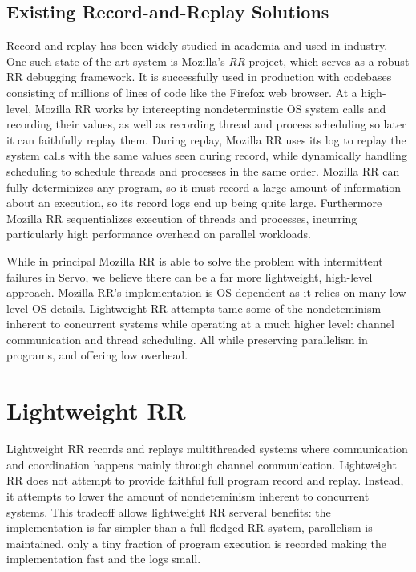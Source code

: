\documentclass{article}
\begin{document}
\subsection{Existing Record-and-Replay Solutions}
Record-and-replay has been widely studied in academia and used in industry. One
such state-of-the-art system is Mozilla's \textit{RR} project, which serves
as a robust RR debugging framework. It is successfully used in production
with codebases consisting of millions of lines of code like the Firefox web browser.
At a high-level, Mozilla RR works by intercepting nondeterminstic OS system calls and recording
their values, as well as recording thread and process scheduling so later it can faithfully
replay them. During replay, Mozilla RR uses its log to replay the system calls with the same
values seen during record, while dynamically handling scheduling to schedule threads
and processes in the same order. Mozilla RR can fully determinizes any program,
so it must record a large amount of information about an execution, so its record logs
end up being quite large. Furthermore Mozilla RR sequentializes execution of threads and
processes, incurring particularly high performance overhead on parallel workloads.

While in principal Mozilla RR is able to solve the problem with intermittent failures in Servo,
we believe there can be a far more lightweight, high-level approach.
Mozilla RR's implementation is OS dependent as it relies on many low-level OS details.
Lightweight RR attempts tame some of the nondeteminism inherent to concurrent systems
while operating at a much higher level: channel communication and thread scheduling.
All while preserving parallelism in programs, and offering low overhead.

\section{Lightweight RR}
Lightweight RR records and replays multithreaded systems
where communication and coordination happens mainly through channel communication.
Lightweight RR does not attempt to provide faithful full program record and replay. Instead,
it attempts to lower the amount of nondeteminism inherent to concurrent systems. This tradeoff
allows lightweight RR serveral benefits: the implementation is far simpler than
a full-fledged RR system, parallelism is maintained, only a tiny fraction of program
execution is recorded making the implementation fast and the logs small.
\end{document}
